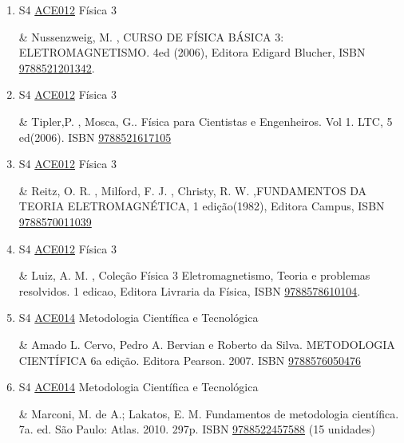 \documentclass[12pt,a4paper]{book}
\begin{document}
\begin{enumerate}
 \item S4 \hyperref[PUD:ACE012]{ACE012} Física 3

& Nussenzweig, M. , CURSO DE FÍSICA BÁSICA 3: ELETROMAGNETISMO.  4ed (2006), Editora Edigard Blucher, ISBN \href{http://www.bn.br/site/pages/servicosProfissionais/agenciaISBN/isbnBusca/FbnBuscaISBNCatalogo.asp?pField=ISBN&pIntPagina=1&pISBN=21201342&nidbISBN=true&hidbISBN=true}{9788521201342}.
 \item S4 \hyperref[PUD:ACE012]{ACE012} Física 3

& Tipler,P. , Mosca, G..  Física para Cientistas e Engenheiros.  Vol 1.  LTC, 5 ed(2006).  ISBN \href{http://www.bn.br/site/pages/servicosProfissionais/agenciaISBN/isbnBusca/FbnBuscaISBNCatalogo.asp?pField=ISBN&pIntPagina=1&pISBN=21617105&nidbISBN=true&hidbISBN=true}{9788521617105}
 

 \item S4 \hyperref[PUD:ACE012]{ACE012} Física 3

& Reitz, O.  R. , Milford, F.  J. , Christy, R. W. ,FUNDAMENTOS DA TEORIA ELETROMAGNÉTICA, 1 edição(1982), Editora Campus, ISBN \href{http://www.bn.br/site/pages/servicosProfissionais/agenciaISBN/isbnBusca/FbnBuscaISBNCatalogo.asp?pField=ISBN&pIntPagina=1&pISBN=70011039&nidbISBN=true&hidbISBN=true}{9788570011039}
 

 \item S4 \hyperref[PUD:ACE012]{ACE012} Física 3

& Luiz, A.  M. , Coleção Física 3 Eletromagnetismo, Teoria e problemas resolvidos.  1 edicao, Editora Livraria da Física, ISBN \href{http://www.bn.br/site/pages/servicosProfissionais/agenciaISBN/isbnBusca/FbnBuscaISBNCatalogo.asp?pField=ISBN&pIntPagina=1&pISBN=78610104&nidbISBN=true&hidbISBN=true}{9788578610104}.
 \item S4 \hyperref[PUD:ACE014]{ACE014} Metodologia Científica e Tecnológica

&   Amado L.  Cervo, Pedro A.  Bervian e Roberto da Silva.  
METODOLOGIA CIENTÍFICA 6a edição.  Editora Pearson.  2007.  ISBN \href{http://www.bn.br/site/pages/servicosProfissionais/agenciaISBN/isbnBusca/FbnBuscaISBNCatalogo.asp?pField=ISBN&pIntPagina=1&pISBN=76050476&nidbISBN=true&hidbISBN=true}{9788576050476}
 

 \item S4 \hyperref[PUD:ACE014]{ACE014} Metodologia Científica e Tecnológica

& Marconi, M.  de A.;  Lakatos, E.  M.  Fundamentos de metodologia científica.  7a.  ed.  São Paulo: Atlas.  2010.  297p.   ISBN \href{http://www.bn.br/site/pages/servicosProfissionais/agenciaISBN/isbnBusca/FbnBuscaISBNCatalogo.asp?pField=ISBN&pIntPagina=1&pISBN=22457588&nidbISBN=true&hidbISBN=true}{9788522457588} (15 unidades)
 


\end{enumerate}
\end{document}
